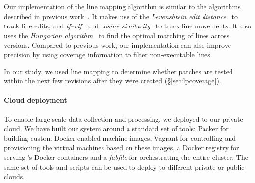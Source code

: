 Our implementation of the line mapping algorithm is similar to the
algorithms described in previous
work~\cite{szz:msr05,szz:ase06,change-source-code:msr07,szzrevisited:defects08}.
It makes use of the \emph{Levenshtein edit
  distance}~\cite{levenshtein1966binary} to track line edits, and
\emph{tf--idf}~\cite{tf-idf} and \emph{cosine
  similarity}~\cite{cosinesimilarity} to track line movements.  It
also uses the \emph{Hungarian algorithm}~\cite{hungarian} to find the
optimal matching of lines across versions.  Compared to previous work,
our implementation can also improve precision by using coverage information to filter
non-executable lines.


In our study, we used line mapping to determine whether patches are
tested within the next few revisions after they were created
(\S\ref{sec:lpcoverage}).

\paragraph{Cloud deployment} To enable large-scale data collection and
processing, we deployed \covrig to our private cloud.  We have built our
system around a standard set of tools: Packer for building custom
Docker-enabled machine images, Vagrant for controlling and provisioning
the virtual machines based on these images, a Docker registry for
serving \covrig's Docker containers and a {\em fabfile} for
orchestrating the entire cluster. The same set of tools and scripts
can be used to deploy \covrig to different private or public clouds.




